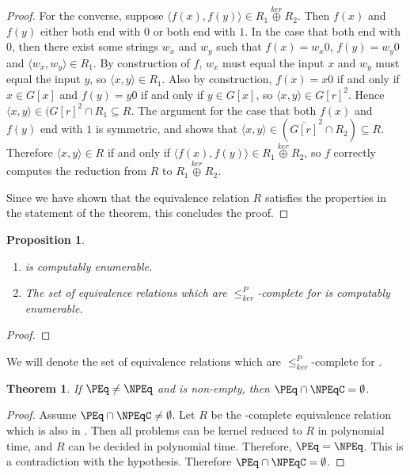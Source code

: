 \documentclass{article}
\newtheorem{theorem}{Theorem}[section]
\newtheorem{proposition}[proposition]{Proposition}
\theoremstyle{definition} \newtheorem{definition}[definition]{Definition}
\newcommand{\kj}{\overset{ker}{\oplus}} %
\newcommand{\kr}{\leq^{P}_{ker}} %
\newcommand{\pair}[2]{\langle#1,#2\rangle} %
\begin{document}
\begin{proof}
  For the converse, suppose $\pair{f(x)}{f(y)}\in R_1\kj R_2$. Then $f(x)$ and
  $f(y)$ either both end with $0$ or both end with $1$. In the case that both
  end with $0$, then there exist some strings $w_x$ and $w_y$ such that
  $f(x)=w_x0$, $f(y)=w_y0$ and $\pair{w_x}{w_y}\in R_1$. By construction of
  $f$, $w_x$ must equal the input $x$ and $w_y$ must equal the input $y$, so
  $\pair{x}{y}\in R_1$. Also by construction, $f(x)=x0$ if and only if $x\in
  G[x]$ and $f(y)=y0$ if and only if $y\in G[x]$, so
  $\pair{x}{y}\in{G[r]}^2$. Hence $\pair{x}{y}\in({G[r]}^2\cap R_1\subseteq
  R$. The argument for the case that both $f(x)$ and $f(y)$ end with $1$ is
  symmetric, and shows that $\pair{x}{y}\in(\overline{G[r]}^2\cap R_2)\subseteq
  R$. Therefore $\pair{x}{y}\in R$ if and only if $\pair{f(x)}{f(y)}\in R_1\kj
  R_2$, so $f$ correctly computes the reduction from $R$ to $R_1\kj R_2$.

  Since we have shown that the equivalence relation $R$ satisfies the
  properties in the statement of the theorem, this concludes the proof.
\end{proof}

\begin{proposition}
  \mbox{} %
  \begin{enumerate}
  \item \PEq is computably enumerable.
  \item The set of equivalence relations which are $\kr$-complete for \NPEq is
    computably enumerable.
  \end{enumerate}
\end{proposition}
\begin{proof}
\end{proof}

We will denote \NPEqC the set of equivalence relations which are $\kr$-complete
for \NPEq.

\begin{theorem}\label{thm:npeqc}
  If $\PEq\neq\NPEq$ and \NPEqC is non-empty, then $\PEq\cap\NPEqC=\emptyset$.
\end{theorem}
\begin{proof}
  Assume $\PEq\cap\NPEqC\neq\emptyset$. Let $R$ be the \NPEq-complete
  equivalence relation which is also in \PEq. Then all problems can be kernel
  reduced to $R$ in polynomial time, and $R$ can be decided in polynomial
  time. Therefore, $\PEq=\NPEq$. This is a contradiction with the
  hypothesis. Therefore $\PEq\cap\NPEqC=\emptyset$.
\end{proof}
\end{document}
